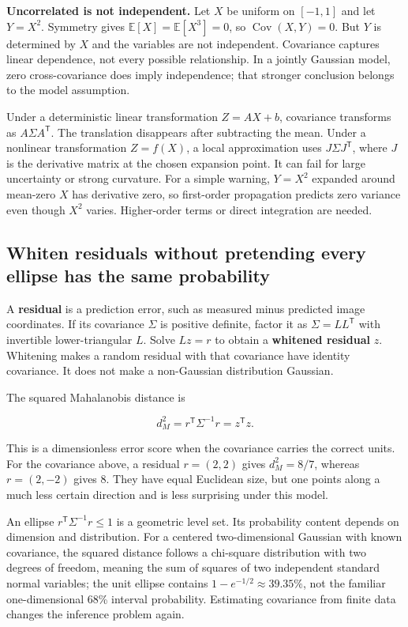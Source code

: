 \textbf{Uncorrelated is not independent.} Let \(X\) be uniform on \([-1,1]\) and let \(Y=X^2\). Symmetry gives \(\mathbb E[X]=\mathbb E[X^3]=0\), so \(\operatorname{Cov}(X,Y)=0\). But \(Y\) is determined by \(X\) and the variables are not independent. Covariance captures linear dependence, not every possible relationship. In a jointly Gaussian model, zero cross-covariance does imply independence; that stronger conclusion belongs to the model assumption.

Under a deterministic linear transformation \(Z=AX+b\), covariance transforms as \(A\Sigma A^{\mathsf T}\). The translation disappears after subtracting the mean. Under a nonlinear transformation \(Z=f(X)\), a local approximation uses \(J\Sigma J^{\mathsf T}\), where \(J\) is the derivative matrix at the chosen expansion point. It can fail for large uncertainty or strong curvature. For a simple warning, \(Y=X^2\) expanded around mean-zero \(X\) has derivative zero, so first-order propagation predicts zero variance even though \(X^2\) varies. Higher-order terms or direct integration are needed.

\subsection{Whiten residuals without pretending every ellipse has the same probability}\label{02-foundations-ii-ch023-whiten-residuals-without-pretending-every-ellipse-has-the-same-probability}

A \textbf{residual} is a prediction error, such as measured minus predicted image coordinates. If its covariance \(\Sigma\) is positive definite, factor it as \(\Sigma=LL^{\mathsf T}\) with invertible lower-triangular \(L\). Solve \(Lz=r\) to obtain a \textbf{whitened residual} \(z\). Whitening makes a random residual with that covariance have identity covariance. It does not make a non-Gaussian distribution Gaussian.

The squared Mahalanobis distance is

\[
d_M^2=r^{\mathsf T}\Sigma^{-1}r=z^{\mathsf T}z.
\]

This is a dimensionless error score when the covariance carries the correct units. For the covariance above, a residual \(r=(2,2)\) gives \(d_M^2=8/7\), whereas \(r=(2,-2)\) gives \(8\). They have equal Euclidean size, but one points along a much less certain direction and is less surprising under this model.

An ellipse \(r^{\mathsf T}\Sigma^{-1}r\le1\) is a geometric level set. Its probability content depends on dimension and distribution. For a centered two-dimensional Gaussian with known covariance, the squared distance follows a chi-square distribution with two degrees of freedom, meaning the sum of squares of two independent standard normal variables; the unit ellipse contains \(1-e^{-1/2}\approx39.35\%\), not the familiar one-dimensional 68\% interval probability. Estimating covariance from finite data changes the inference problem again.


